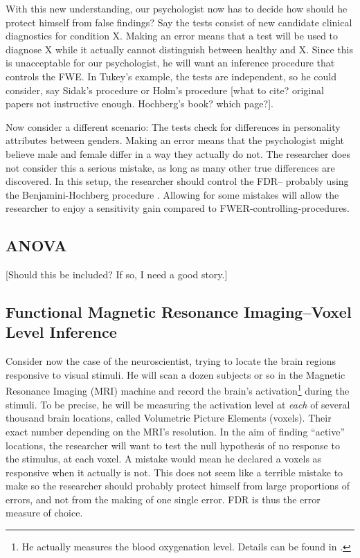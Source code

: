 \documentclass[draft,12pt]{article}
\begin{document}
With this new understanding, our psychologist now has to decide how should he protect himself from false findings? 
Say the tests consist of new candidate clinical diagnostics for condition X. Making an error means that a test will be used to diagnose X while it actually cannot distinguish between healthy and X. Since this is unacceptable for our psychologist, he will want an inference procedure that controls the FWE. In Tukey's example, the tests are independent, so he could consider, say Sidak's procedure or Holm's procedure [what to cite? original papers not instructive enough. Hochberg's book? which page?].


Now consider a different scenario: The tests check for differences in personality attributes between genders. Making an error means that the psychologist might believe male and female differ in a way they actually do not. The researcher does not consider this a serious mistake, as long as many other true differences are discovered. In this setup, the researcher should control the FDR-- probably using the Benjamini-Hochberg procedure \citep{benjamini_controlling_1995}. Allowing for some mistakes will allow the researcher to enjoy a sensitivity gain compared to FWER-controlling-procedures.


\subsection{ANOVA}
[Should this be included? If so, I need a good story.]



\subsection{\label{sub:fMRI}Functional Magnetic Resonance Imaging--Voxel Level Inference}
Consider now the case of the neuroscientist, trying to locate the brain regions responsive to visual stimuli. He will scan a dozen subjects or so in the Magnetic Resonance Imaging (MRI) machine and record the brain's activation\footnote{ He actually measures the blood oxygenation level. Details can be found in \cite{lazar_statistical_2008}.} during the stimuli. To be precise, he will be measuring the activation level at \emph{each} of several thousand brain locations, called Volumetric Picture Elements (voxels). Their exact number depending on the MRI's resolution. 
In the aim of finding ``active'' locations, the researcher will want to test the null hypothesis of no response to the stimulus, at each voxel. A mistake would mean he declared a voxels as responsive when it actually is not. This does not seem like a terrible mistake to make so the researcher should probably protect himself from large proportions of errors, and not from the making of one single error. FDR is thus the error measure of choice.
\end{document}
